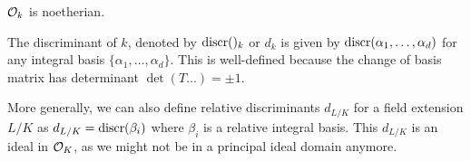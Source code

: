 \begin{outline}
    \begin{corollary}
        $\mathcal{O}_k$ is noetherian. 
    \end{corollary}
    
    \begin{definition}
        The discriminant of $k$, denoted by $\operatorname{discr}({})_k$ or $d_k$ is given by $\operatorname{discr}({ \alpha_1, \ldots, \alpha_d })$ for any integral basis $\{\alpha_1,\ldots,\alpha_d\}$. This is well-defined because the change of basis matrix has determinant $\det(T...)=\pm 1$.
    \end{definition}
    
    More generally, we can also define relative discriminants $d_{L/K}$ for a field extension $L/K$ as $d_{L/K} = \operatorname{discr}({\beta_i})$ where ${\beta_i}$ is a relative integral basis. This $d_{L/K}$ is an ideal in $\mathcal{O}_K$, as we might not be in a principal ideal domain anymore.


\end{outline}
